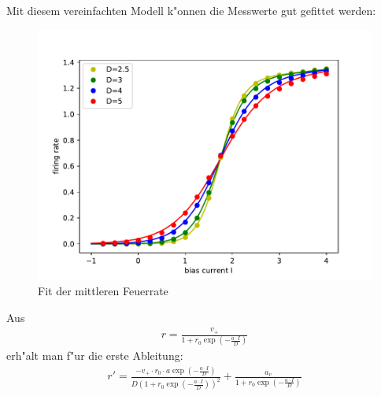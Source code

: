 \documentclass[12pt,a4paper]{article}
\begin{document}
Mit diesem vereinfachten Modell k"onnen die Messwerte gut gefittet werden:
\begin{figure}[H]
	\centering
	\includegraphics[scale=0.9]{gfit29m.pdf}
	\caption{Fit der mittleren Feuerrate}
	\label{gfit}
\end{figure}
Aus
\begin{align*}
r=\frac{v_+}{1+r_0\exp(-\frac{a\cdot I}{D})}
\end{align*}
erh"alt man f"ur die erste Ableitung:
\begin{align*}
r'=\frac{-v_+\cdot r_0\cdot a \exp(-\frac{a\cdot I}{D})}{D(1+r_0\exp(-\frac{a\cdot I}{D}))^2}+\frac{a_v}{1+r_0\exp(-\frac{a\cdot I}{D})}
\end{align*}
\end{document}
